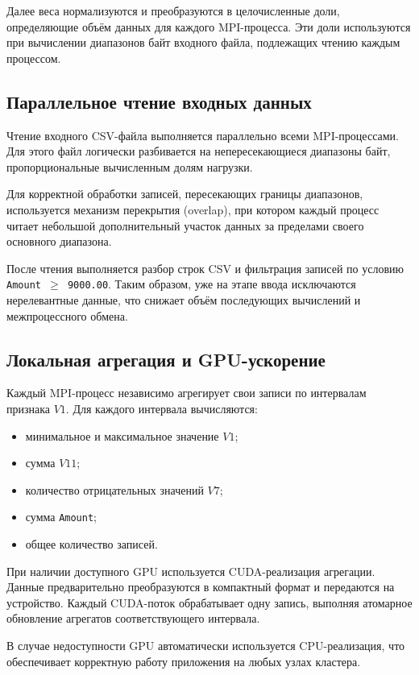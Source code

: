 \documentclass[areaset=advanced]{scrartcl}
\begin{document}
Далее веса нормализуются и преобразуются в целочисленные доли, определяющие
объём данных для каждого MPI-процесса. Эти доли используются при вычислении
диапазонов байт входного файла, подлежащих чтению каждым процессом.

\subsection{Параллельное чтение входных данных}

Чтение входного CSV-файла выполняется параллельно всеми MPI-процессами.
Для этого файл логически разбивается на непересекающиеся диапазоны байт,
пропорциональные вычисленным долям нагрузки.

Для корректной обработки записей, пересекающих границы диапазонов, используется
механизм перекрытия (overlap), при котором каждый процесс читает небольшой
дополнительный участок данных за пределами своего основного диапазона.

После чтения выполняется разбор строк CSV и фильтрация записей по условию
\texttt{Amount $\geq$ 9000.00}. Таким образом, уже на этапе ввода исключаются
нерелевантные данные, что снижает объём последующих вычислений и межпроцессного
обмена.


\subsection{Локальная агрегация и GPU-ускорение}

Каждый MPI-процесс независимо агрегирует свои записи по интервалам признака $V1$.
Для каждого интервала вычисляются:
\begin{itemize}
  \item минимальное и максимальное значение $V1$;
  \item сумма $V11$;
  \item количество отрицательных значений $V7$;
  \item сумма \texttt{Amount};
  \item общее количество записей.
\end{itemize}

При наличии доступного GPU используется CUDA-реализация агрегации. Данные
предварительно преобразуются в компактный формат и передаются на устройство.
Каждый CUDA-поток обрабатывает одну запись, выполняя атомарное обновление
агрегатов соответствующего интервала.

В случае недоступности GPU автоматически используется CPU-реализация,
что обеспечивает корректную работу приложения на любых узлах кластера.
\end{document}
